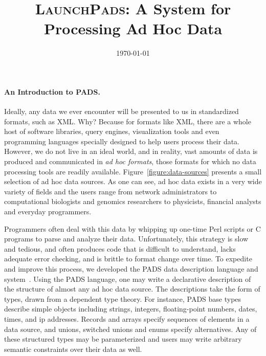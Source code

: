 \documentclass[nocopyrightspace]{sigplanconf}
\title{\textsc{LaunchPads}: A System for Processing Ad Hoc Data}
\date{\today}
\begin{document}
\maketitle


\paragraph*{An Introduction to PADS.}
Ideally, any data we ever encounter will be presented to us
in standardized formats, such as \textsc{XML}.  Why?  Because
for formats like \textsc{XML}, there are a whole host of software libraries,
query engines, visualization tools and even programming languages
specially designed to help users process their data.
However, we do not live in an ideal world, and in reality, 
vast amounts of data is produced and communicated 
in \textit{ad hoc formats}, those formats for which
no data processing tools are readily available.  Figure~\ref{figure:data-sources} presents a small selection of ad hoc data sources.
As one can see, ad hoc data exists in a very wide variety of fields
and the users range from network administrators to computational 
biologists and genomics researchers to physicists, financial 
analysts and everyday programmers.

Programmers often deal with this data by whipping up one-time Perl scripts
or C programs to parse and analyze their data.  Unfortunately, this
strategy is slow and tedious, and often produces code that is 
difficult to understand, 
lacks adequate error checking, and 
is brittle to format change over time.
To expedite and improve this process, we developed
the \textsc{PADS} data description language and system~\cite{fisher+:pldi05,fisher+:popl06}.  Using the
\textsc{PADS} language, one may write a declarative
description of the structure of almost any ad hoc data source.  
The descriptions take the form of types,
drawn from a dependent type theory.  For instance, \textsc{PADS} 
base types describe simple objects including
strings, integers, floating-point numbers, dates, times, and ip addresses.
Records and arrays specify sequences of elements in a data source, 
and unions, switched unions and enums specify
alternatives.  Any of these structured types may be 
parameterized and
users may write arbitrary semantic constraints over their data
as well.
\end{document}
